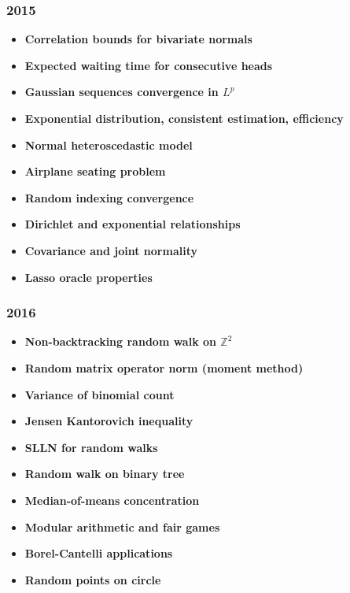 \subsubsection*{2015}
\begin{itemize}
    \item \textbf{Correlation bounds for bivariate normals}
    \item \textbf{Expected waiting time for consecutive heads}
    \item \textbf{Gaussian sequences convergence in $L^p$}
    \item \textbf{Exponential distribution, consistent estimation, efficiency}
    \item \textbf{Normal heteroscedastic model}
    \item \textbf{Airplane seating problem}
    \item \textbf{Random indexing convergence}
    \item \textbf{Dirichlet and exponential relationships}
    \item \textbf{Covariance and joint normality}
    \item \textbf{Lasso oracle properties}
\end{itemize}

\subsubsection*{2016}
\begin{itemize}
    \item \textbf{Non-backtracking random walk on $\mathbb{Z}^2$}
    \item \textbf{Random matrix operator norm (moment method)}
    \item \textbf{Variance of binomial count}
    \item \textbf{Jensen Kantorovich inequality}
    \item \textbf{SLLN for random walks}
    \item \textbf{Random walk on binary tree}
    \item \textbf{Median-of-means concentration}
    \item \textbf{Modular arithmetic and fair games}
    \item \textbf{Borel-Cantelli applications}
    \item \textbf{Random points on circle}
\end{itemize}

